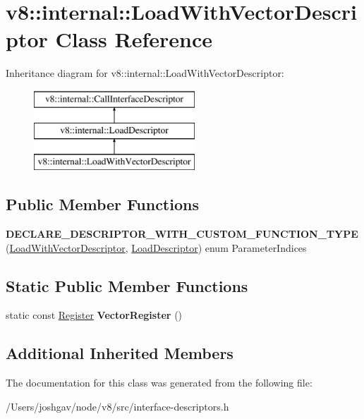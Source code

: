 \hypertarget{classv8_1_1internal_1_1_load_with_vector_descriptor}{}\section{v8\+:\+:internal\+:\+:Load\+With\+Vector\+Descriptor Class Reference}
\label{classv8_1_1internal_1_1_load_with_vector_descriptor}
Inheritance diagram for v8\+:\+:internal\+:\+:Load\+With\+Vector\+Descriptor\+:\begin{figure}[H]
\begin{center}
\leavevmode
\includegraphics[height=3.000000cm]{classv8_1_1internal_1_1_load_with_vector_descriptor}
\end{center}
\end{figure}
\subsection*{Public Member Functions}
\begin{DoxyCompactItemize}
\item 
{\bfseries D\+E\+C\+L\+A\+R\+E\+\_\+\+D\+E\+S\+C\+R\+I\+P\+T\+O\+R\+\_\+\+W\+I\+T\+H\+\_\+\+C\+U\+S\+T\+O\+M\+\_\+\+F\+U\+N\+C\+T\+I\+O\+N\+\_\+\+T\+Y\+PE} (\hyperlink{classv8_1_1internal_1_1_load_with_vector_descriptor}{Load\+With\+Vector\+Descriptor}, \hyperlink{classv8_1_1internal_1_1_load_descriptor}{Load\+Descriptor}) enum Parameter\+Indices\hypertarget{classv8_1_1internal_1_1_load_with_vector_descriptor_afa80e5d3a4b2e05b697d58ddff87defe}{}\label{classv8_1_1internal_1_1_load_with_vector_descriptor_afa80e5d3a4b2e05b697d58ddff87defe}

\end{DoxyCompactItemize}
\subsection*{Static Public Member Functions}
\begin{DoxyCompactItemize}
\item 
static const \hyperlink{structv8_1_1internal_1_1_register}{Register} {\bfseries Vector\+Register} ()\hypertarget{classv8_1_1internal_1_1_load_with_vector_descriptor_a7c055edc4acd3c2b469e402673b9e602}{}\label{classv8_1_1internal_1_1_load_with_vector_descriptor_a7c055edc4acd3c2b469e402673b9e602}

\end{DoxyCompactItemize}
\subsection*{Additional Inherited Members}


The documentation for this class was generated from the following file\+:\begin{DoxyCompactItemize}
\item 
/\+Users/joshgav/node/v8/src/interface-\/descriptors.\+h\end{DoxyCompactItemize}
